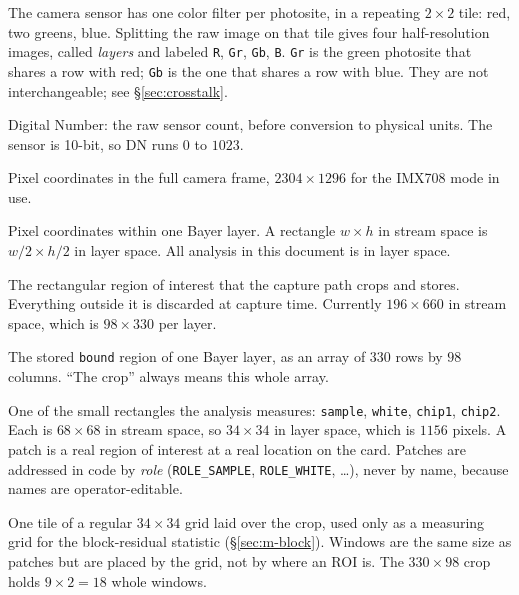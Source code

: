 \documentclass[11pt, a4paper]{article}
\newcommand{\code}[1]{\texttt{#1}}
\begin{document}
\begin{description}[style=nextline, leftmargin=1em]

\item[Bayer layer]
  The camera sensor has one color filter per photosite,
  in a repeating $2\times2$ tile:
  red, two greens, blue.
  Splitting the raw image on that tile gives four half-resolution images,
  called \emph{layers} and labeled \code{R}, \code{Gr}, \code{Gb}, \code{B}.
  \code{Gr} is the green photosite that shares a row with red;
  \code{Gb} is the one that shares a row with blue.
  They are not interchangeable;
  see \S\ref{sec:crosstalk}.

\item[DN]
  Digital Number: the raw sensor count, before conversion to physical units.
  The sensor is 10-bit, so DN runs $0$ to $1023$.

\item[Stream space]
  Pixel coordinates in the full camera frame,
  $2304\times1296$ for the IMX708 mode in use.

\item[Layer space]
  Pixel coordinates within one Bayer layer.
  A rectangle $w\times h$ in stream space is $w/2 \times h/2$ in layer space.
  All analysis in this document is in layer space.

\item[\code{bound}]
  The rectangular region of interest that the capture path crops and stores.
  Everything outside it is discarded at capture time.
  Currently $196\times660$ in stream space,
  which is $98\times330$ per layer.

\item[Crop]
  The stored \code{bound} region of one Bayer layer,
  as an array of $330$ rows by $98$ columns.
  ``The crop'' always means this whole array.

\item[Patch]
  One of the small rectangles the analysis measures:
  \code{sample}, \code{white}, \code{chip1}, \code{chip2}.
  Each is $68\times68$ in stream space,
  so $34\times34$ in layer space, which is $1156$ pixels.
  A patch is a real region of interest at a real location on the card.
  Patches are addressed in code by \emph{role}
  (\code{ROLE\_SAMPLE}, \code{ROLE\_WHITE}, \ldots), never by name,
  because names are operator-editable.

\item[Window]
  One tile of a regular $34\times34$ grid laid over the crop,
  used only as a measuring grid for the block-residual statistic
  (\S\ref{sec:m-block}).
  Windows are the same size as patches
  but are placed by the grid, not by where an ROI is.
  The $330\times98$ crop holds $9\times2 = 18$ whole windows.


\end{description}
\end{document}

